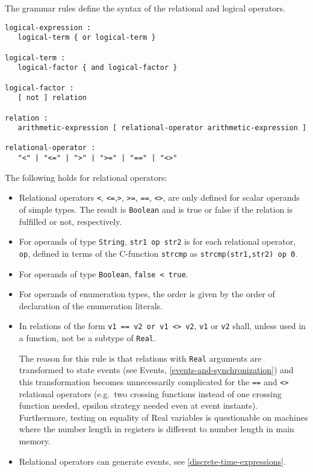 The grammar rules define the syntax of the relational and logical
operators.

\begin{lstlisting}[language=grammar]
logical-expression :
   logical-term { or logical-term }

logical-term :
   logical-factor { and logical-factor }

logical-factor :
   [ not ] relation

relation :
   arithmetic-expression [ relational-operator arithmetic-expression ]

relational-operator :
   "<" | "<=" | ">" | ">=" | "==" | "<>"
\end{lstlisting}

The following holds for relational operators:
\begin{itemize}
\item
  Relational operators \lstinline!<!, \lstinline!<=!,\lstinline!>!,
\lstinline!>=!, \lstinline!==!, \lstinline!<>!, are only defined for
  scalar operands of simple types. The result is \lstinline!Boolean! and is true or
  false if the relation is fulfilled or not, respectively.
\item
  For operands of type \lstinline!String!, \lstinline!str1 op str2! is for each relational
  operator, \lstinline!op!, defined in terms of the C-function \lstinline!strcmp! as
  \lstinline!strcmp(str1,str2) op 0!.
\item
  For operands of type \lstinline!Boolean!, \lstinline!false < true!.
\item
  For operands of enumeration types, the order is given by the order of
  declaration of the enumeration literals.
\item
  In relations of the form \lstinline!v1 == v2 or v1 <> v2!,
  \lstinline!v1! or \lstinline!v2! shall, unless used in a function, not be a subtype of \lstinline!Real!.
  \begin{nonnormative}
  The reason for this rule is that relations with \lstinline!Real! arguments are transformed to state events (see Events, \cref{events-and-synchronization})
  and this transformation becomes unnecessarily complicated for the \lstinline!==! and \lstinline!<>! relational operators (e.g.\ two crossing functions instead
  of one crossing function needed, epsilon strategy needed even at event instants). Furthermore, testing on equality of Real variables is questionable on machines
  where the number length in registers is different to number length in main memory.
  \end{nonnormative}
\item
  Relational operators can generate events, see \cref{discrete-time-expressions}.
\end{itemize}


